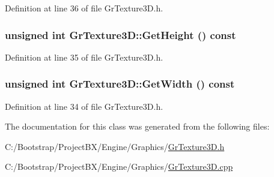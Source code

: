 Definition at line 36 of file GrTexture3D.h.\hypertarget{class_gr_texture3_d_0950cc460af54502140d7fb34c04f3a7}{
\subsubsection[{GetHeight}]{\setlength{\rightskip}{0pt plus 5cm}unsigned int GrTexture3D::GetHeight () const}}
\label{class_gr_texture3_d_0950cc460af54502140d7fb34c04f3a7}




Definition at line 35 of file GrTexture3D.h.\hypertarget{class_gr_texture3_d_e8d6fe931d4ff64e7e8de9274c647ea5}{
\subsubsection[{GetWidth}]{\setlength{\rightskip}{0pt plus 5cm}unsigned int GrTexture3D::GetWidth () const}}
\label{class_gr_texture3_d_e8d6fe931d4ff64e7e8de9274c647ea5}




Definition at line 34 of file GrTexture3D.h.

The documentation for this class was generated from the following files:\begin{CompactItemize}
\item 
C:/Bootstrap/ProjectBX/Engine/Graphics/\hyperlink{_gr_texture3_d_8h}{GrTexture3D.h}\item 
C:/Bootstrap/ProjectBX/Engine/Graphics/\hyperlink{_gr_texture3_d_8cpp}{GrTexture3D.cpp}\end{CompactItemize}
